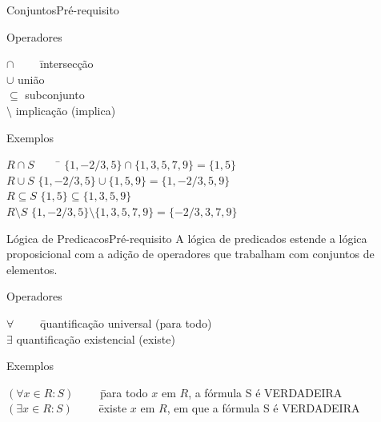 \begin{frame}{Conjuntos}{Pré-requisito}

  \begin{block}{Operadores}
    \begin{tabbing}
        $\cap\qquad$ \= intersecção \\
        $\cup$  \> união \\
        $\subseteq$ \> subconjunto \\
        $\setminus$ \> implicação (implica) \\
      \end{tabbing}
  \end{block}

    \pause
    \begin{block}{Exemplos}\tiny
      \begin{tabbing}
        $R\cap S\qquad$ \= $\{1, -2/3, 5\}\cap\{1,3,5,7,9\} = \{1,5\} $ \\
        $R\cup S$  \> $\{1, -2/3, 5\}\cup\{1,5,9\} = \{1,-2/3,5,9\} $ \\
        $R\subseteq S$ \> $\{1, 5\}\subseteq\{1,3,5,9\}$ \\
        $R\setminus S$ \> $\{1, -2/3, 5\}\setminus\{1,3,5,7,9\} = \{-2/3,3,7,9\} $ \\
      \end{tabbing}
    \end{block}
  
\end{frame}

\begin{frame}{Lógica de Predicacos}{Pré-requisito}
  A lógica de predicados estende a lógica proposicional com 
  a adição de operadores que trabalham com conjuntos de elementos.

  \begin{block}{Operadores}
    \begin{tabbing}
        $\forall\qquad$ \= quantificação universal (para todo) \\
        $\exists$  \> quantificação existencial (existe) \\
      \end{tabbing}
  \end{block}

    \pause
    \begin{block}{Exemplos}\tiny
      \begin{tabbing}
        $ (\forall x \in R: S) \qquad$ \= para todo $x$ em $R$, a fórmula S é {\sc VERDADEIRA} \\
        $ (\exists x \in R: S) \qquad$ \= existe $x$ em $R$, em que a fórmula S é {\sc VERDADEIRA} \\
      \end{tabbing}
    \end{block}
  
\end{frame}

